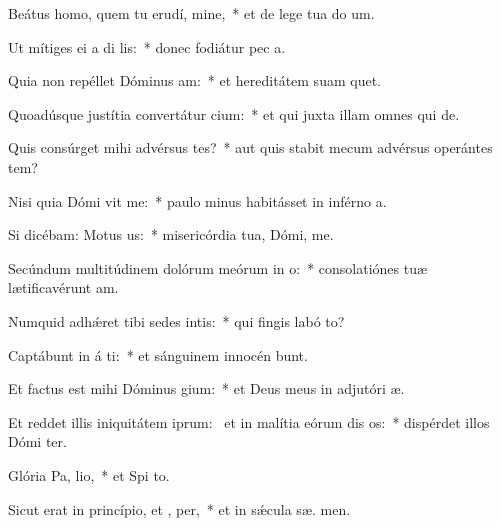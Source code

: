 \item Beátus homo, quem tu erudí, mine,~* et de lege tua do um.
\item Ut mítiges ei a di lis:~* donec fodiátur pec a.
\item Quia non repéllet Dóminus  am:~* et hereditátem suam  quet.
\item Quoadúsque justítia convertátur  cium:~* et qui juxta illam omnes qui   de.
\item Quis consúrget mihi advérsus tes?~* aut quis stabit mecum advérsus operántes tem?
\item Nisi quia Dómi vit me:~* paulo minus habitásset in inférno  a.
\item Si dicébam: Motus   us:~* misericórdia tua, Dómi,  me.
\item Secúndum multitúdinem dolórum meórum in  o:~* consolatiónes tuæ lætificavérunt  am.
\item Numquid adhǽret tibi sedes intis:~* qui fingis labó  to?
\item Captábunt in á ti:~* et sánguinem innocén bunt.
\item Et factus est mihi Dóminus  gium:~* et Deus meus in adjutóri  æ.
\item Et reddet illis iniquitátem iprum:~\pscross{} et in malítia eórum dis os:~* dispérdet illos Dómi  ter.
\item Glória Pa,  lio,~* et Spi to.
\item Sicut erat in princípio, et ,  per,~* et in sǽcula sæ. men.
